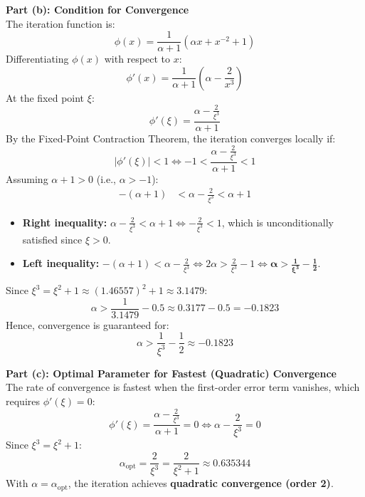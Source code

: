 \documentclass[11pt,a4paper]{article}
\numberwithin{equation}{section}
\begin{document}
\begin{solbox}
\vspace{0.3cm}
\noindent\textbf{Part (b): Condition for Convergence} \\
The iteration function is:
\begin{equation}
    \phi(x) = \frac{1}{\alpha + 1} \left( \alpha x + x^{-2} + 1 \right)
\end{equation}
Differentiating $\phi(x)$ with respect to $x$:
\begin{equation}
    \phi'(x) = \frac{1}{\alpha + 1} \left( \alpha - \frac{2}{x^3} \right)
\end{equation}
At the fixed point $\xi$:
\begin{equation}
    \phi'(\xi) = \frac{\alpha - \frac{2}{\xi^3}}{\alpha + 1}
\end{equation}
By the Fixed-Point Contraction Theorem, the iteration converges locally if:
\begin{equation}
    |\phi'(\xi)| < 1 \iff -1 < \frac{\alpha - \frac{2}{\xi^3}}{\alpha + 1} < 1
\end{equation}
Assuming $\alpha + 1 > 0$ (i.e., $\alpha > -1$):
\begin{align}
    -(\alpha + 1) &< \alpha - \frac{2}{\xi^3} < \alpha + 1
\end{align}
\begin{itemize}[leftmargin=1.5em]
    \item \textbf{Right inequality:} $\alpha - \frac{2}{\xi^3} < \alpha + 1 \iff -\frac{2}{\xi^3} < 1$, which is unconditionally satisfied since $\xi > 0$.
    \item \textbf{Left inequality:} $-(\alpha + 1) < \alpha - \frac{2}{\xi^3} \iff 2\alpha > \frac{2}{\xi^3} - 1 \iff \mathbf{\alpha > \frac{1}{\xi^3} - \frac{1}{2}}$.
\end{itemize}
Since $\xi^3 = \xi^2 + 1 \approx (1.46557)^2 + 1 \approx 3.1479$:
\begin{equation}
    \alpha > \frac{1}{3.1479} - 0.5 \approx 0.3177 - 0.5 = -0.1823
\end{equation}
Hence, convergence is guaranteed for:
\begin{equation}
    \boxed{\alpha > \frac{1}{\xi^3} - \frac{1}{2} \approx -0.1823}
\end{equation}

\vspace{0.3cm}
\noindent\textbf{Part (c): Optimal Parameter for Fastest (Quadratic) Convergence} \\
The rate of convergence is fastest when the first-order error term vanishes, which requires $\phi'(\xi) = 0$:
\begin{equation}
    \phi'(\xi) = \frac{\alpha - \frac{2}{\xi^3}}{\alpha + 1} = 0 \iff \alpha - \frac{2}{\xi^3} = 0
\end{equation}
Since $\xi^3 = \xi^2 + 1$:
\begin{equation}
    \boxed{\alpha_{\text{opt}} = \frac{2}{\xi^3} = \frac{2}{\xi^2 + 1} \approx 0.635344}
\end{equation}
With $\alpha = \alpha_{\text{opt}}$, the iteration achieves \textbf{quadratic convergence (order 2)}.


\end{solbox}
\end{document}
